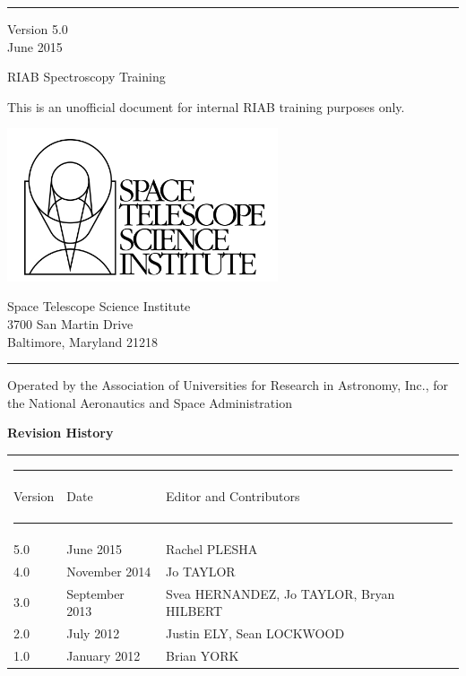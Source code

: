 \begin{titlepage}
\rule{165mm}{0.8mm}
Version 5.0 \\
June 2015

\vspace{30mm}
{\Huge RIAB Spectroscopy Training }

\vspace{10mm}
{\large This is an unofficial document for internal RIAB training purposes only.}
\vspace{65mm}

\begin{minipage}[l]{80mm}
\includegraphics[width=8cm]{logo.jpg}

\end{minipage}
%
\hspace{5mm}
\begin{minipage}[u]{75mm}
\begin{flushright}
Space Telescope Science Institute \\
3700 San Martin Drive \\
Baltimore, Maryland 21218
\end{flushright}
\end{minipage}

\rule{165mm}{0.8mm}

{\scriptsize Operated by the Association of Universities for Research in Astronomy, Inc., for the National Aeronautics and Space Administration }
 
 \newpage
  \thispagestyle{empty}  
  
{\Large \bf Revision History}



\begin{table}[h]
\begin{tabular}{lll} 
\multicolumn{3}{c}{ \rule{130mm}{0.2mm}}      \\
Version  & Date & Editor and Contributors    {\rule [-3mm]{0mm}{8mm}  }\\ 
 \multicolumn{3}{c}{ \rule[2mm]{130mm}{0.8mm}}      \\
      5.0                 &  June 2015 & Rachel PLESHA \\
      4.0                 &  November 2014  & Jo TAYLOR  \\ 
      3.0                 &  September 2013  & Svea HERNANDEZ, Jo TAYLOR, Bryan HILBERT  \\ 
      2.0                 &  July 2012  & Justin ELY, Sean LOCKWOOD  \\ 
      1.0                 &  January 2012  & Brian YORK  \\ 
 

\end{tabular}
\end{table}
\end{titlepage}
